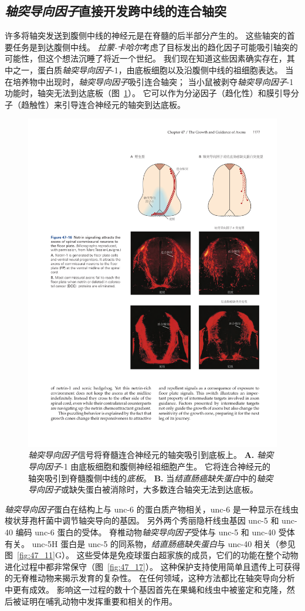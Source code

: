 \subsection{\textit{轴突导向因子}直接开发跨中线的连合轴突}

许多将轴突发送到腹侧中线的神经元是在脊髓的后半部分产生的。
这些轴突的首要任务是到达腹侧中线。
\textit{拉蒙-卡哈尔}考虑了目标发出的趋化因子可能吸引轴突的可能性，但这个想法沉睡了将近一个世纪。
我们现在知道这些因素确实存在，其中之一，蛋白质\textit{轴突导向因子}-1，由底板细胞以及沿腹侧中线的祖细胞表达。
当在培养物中出现时，\textit{轴突导向因子}吸引连合轴突；
当小鼠被剥夺\textit{轴突导向因子}-1 功能时，轴突无法到达底板（图~\ref{fig:47_16}）。
它可以作为分泌因子（趋化性）和膜引导分子（趋触性）来引导连合神经元的轴突到达底板。


\begin{figure}[htbp]
	\centering
	\includegraphics[width=0.75\linewidth]{chap47/fig_47_16}
	\caption{\textit{轴突导向因子}信号将脊髓连合神经元的轴突吸引到底板上。
		\textbf{A.} \textit{轴突导向因子}-1 由底板细胞和腹侧神经祖细胞产生。
		它将连合神经元的轴突吸引到脊髓腹侧中线的\textit{底板}。
		\textbf{B.} 当\textit{结直肠癌缺失蛋白}中的\textit{轴突导向因子}或缺失蛋白被消除时，大多数连合轴突无法到达底板。}
	\label{fig:47_16}
\end{figure}


\textit{轴突导向因子}蛋白在结构上与 unc-6 的蛋白质产物相关，unc-6 是一种显示在线虫梭状芽孢杆菌中调节轴突导向的基因。
另外两个秀丽隐杆线虫基因 unc-5 和 unc-40 编码 unc-6 蛋白的受体。
脊椎动物\textit{轴突导向因子}受体与 unc-5 和 unc-40 受体有关。
unc-5H 蛋白是 unc-5 的同系物，\textit{结直肠癌缺失蛋白}与 unc-40 相关（参见图~\ref{fig:47_11}G）。
这些受体是免疫球蛋白超家族的成员，它们的功能在整个动物进化过程中都非常保守（图~\ref{fig:47_17}）。
这种保护支持使用简单且遗传上可获得的无脊椎动物来揭示发育的复杂性。
在任何领域，这种方法都比在轴突导向分析中更有成效。
影响这一过程的数十个基因首先在果蝇和线虫中被鉴定和克隆，然后被证明在哺乳动物中发挥重要和相关的作用。


